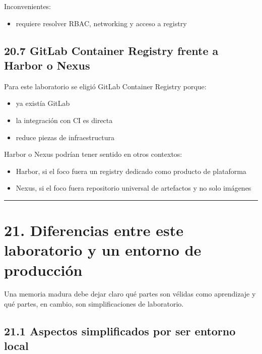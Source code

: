 \documentclass[
a4paper,
12pt]{report}
\providecommand{\tightlist}{%
  \setlength{\itemsep}{0pt}\setlength{\parskip}{0pt}}
\begin{document}
Inconvenientes:

\begin{itemize}
\tightlist
\item
  requiere resolver RBAC, networking y acceso a registry
\end{itemize}

\section{20.7 GitLab Container Registry frente a Harbor o
Nexus}\label{gitlab-container-registry-frente-a-harbor-o-nexus}

Para este laboratorio se eligió GitLab Container Registry porque:

\begin{itemize}
\tightlist
\item
  ya existía GitLab
\item
  la integración con CI es directa
\item
  reduce piezas de infraestructura
\end{itemize}

Harbor o Nexus podrían tener sentido en otros contextos:

\begin{itemize}
\tightlist
\item
  Harbor, si el foco fuera un registry dedicado como producto de
  plataforma
\item
  Nexus, si el foco fuera repositorio universal de artefactos y no solo
  imágenes
\end{itemize}

\begin{center}\rule{0.5\linewidth}{0.5pt}\end{center}

\chapter{21. Diferencias entre este laboratorio y un entorno de
producción}\label{diferencias-entre-este-laboratorio-y-un-entorno-de-producciuxf3n}

Una memoria madura debe dejar claro qué partes son vélidas como
aprendizaje y qué partes, en cambio, son simplificaciones de
laboratorio.

\section{21.1 Aspectos simplificados por ser entorno
local}\label{aspectos-simplificados-por-ser-entorno-local}
\end{document}
